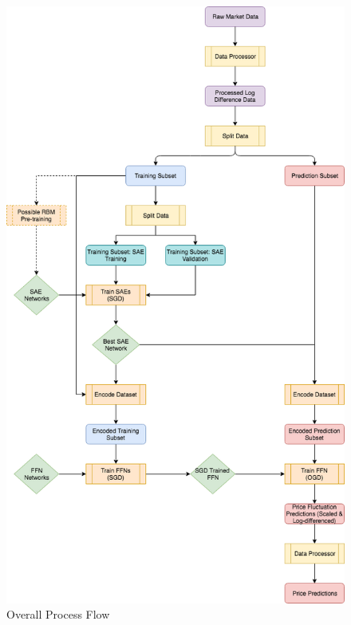 \documentclass[a4paper,11pt,oneside]{article}
\theoremstyle{plain}
\theoremstyle{definition}
\begin{document}
\begin{figure}[H]
	\centering \includegraphics[scale=0.5]{images/process_implementation/process_flow.png}
	\caption{Overall Process Flow}
	\label{figure-proc_diagram}
\end{figure}
\end{document}
